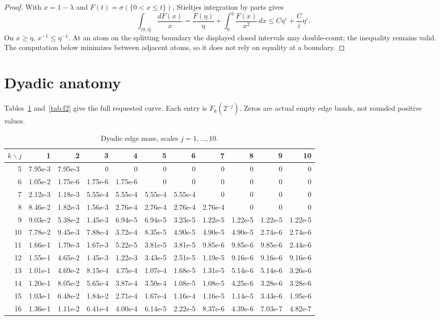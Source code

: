 \documentclass[11pt]{article}
\theoremstyle{remark}
\begin{document}
\begin{proof}
With $x=1-\lambda$ and $F(t)=\sigma(\{0<x\le t\})$,
Stieltjes integration by parts gives
\[
 \int_{(0,\eta]}\frac{dF(x)}x
 =\frac{F(\eta)}{\eta}+\int_0^\eta\frac{F(x)}{x^2}\,dx
 \le C\eta^\varepsilon+\frac C\varepsilon\eta^\varepsilon.
\]
On $x\ge\eta$, $x^{-1}\le\eta^{-1}$.  At an atom on the splitting
boundary the displayed closed intervals may double-count; the
inequality remains valid.  The computation below minimizes between
adjacent atoms, so it does not rely on equality at a boundary.
\end{proof}

\section{Dyadic anatomy}

Tables~\ref{tab:f1} and~\ref{tab:f2} give the full requested curve.
Each entry is $F_k(2^{-j})$.  Zeros are actual empty edge bands, not
rounded positive values.

\begin{table}[ht]
\centering\scriptsize
\caption{Dyadic edge mass, scales $j=1,\ldots,10$.}
\label{tab:f1}
\begin{tabular}{@{}r*{10}{r}@{}}
\toprule
$k\backslash j$&1&2&3&4&5&6&7&8&9&10\\
\midrule
5&7.95e-3&7.95e-3&0&0&0&0&0&0&0&0\\
6&1.05e-2&1.75e-6&1.75e-6&1.75e-6&0&0&0&0&0&0\\
7&2.12e-3&1.18e-3&5.55e-4&5.55e-4&5.55e-4&5.55e-4&0&0&0&0\\
8&8.46e-2&1.82e-3&1.56e-3&2.76e-4&2.76e-4&2.76e-4&2.76e-4&0&0&0\\
9&9.03e-2&5.38e-2&1.45e-3&6.94e-5&6.94e-5&3.23e-5&1.22e-5&1.22e-5&1.22e-5&1.22e-5\\
10&7.78e-2&9.45e-3&7.88e-4&3.72e-4&8.35e-5&4.90e-5&4.90e-5&4.90e-5&2.74e-6&2.74e-6\\
11&1.66e-1&1.79e-3&1.67e-3&5.22e-5&3.81e-5&3.81e-5&9.85e-6&9.85e-6&9.85e-6&2.44e-6\\
12&1.55e-1&4.65e-2&1.45e-3&1.22e-3&3.43e-5&2.51e-5&1.19e-5&9.16e-6&9.16e-6&9.16e-6\\
13&1.01e-1&4.69e-2&8.15e-4&4.75e-4&1.07e-4&1.68e-5&1.31e-5&5.14e-6&5.14e-6&3.26e-6\\
14&1.20e-1&8.05e-2&5.65e-4&3.87e-4&3.50e-4&1.08e-5&1.08e-5&4.25e-6&3.28e-6&3.28e-6\\
15&1.03e-1&6.48e-2&1.84e-2&2.71e-4&1.67e-4&1.16e-4&1.16e-5&1.14e-5&3.43e-6&1.95e-6\\
16&1.36e-1&1.11e-2&6.41e-4&4.00e-4&6.14e-5&2.22e-5&8.37e-6&4.39e-6&7.03e-7&4.82e-7\\
\bottomrule
\end{tabular}
\end{table}
\end{document}

